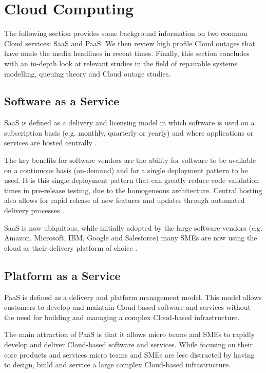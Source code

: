 \section{Cloud Computing}

The following section provides some background information on two common Cloud services: SaaS and PaaS. We then review high profile Cloud outages that have made the media headlines in recent times. Finally, this section concludes with an in-depth look at relevant studies in the field of repairable systems modelling, queuing theory and Cloud outage studies.

\subsection{Software as a Service}

SaaS is defined as a delivery and licensing model in which software is used on a subscription basis (e.g. monthly, quarterly or yearly) and where applications or services are hosted centrally \cite{Cloudbook2015}. \par

The key benefits for software vendors are the ability for software to be available on a continuous basis (on-demand) and for a single deployment pattern to be used. It is this single deployment pattern that can greatly reduce code validation times in pre-release testing, due to the homogeneous architecture. Central hosting also allows for rapid release of new features and updates through automated delivery processes \cite{datacentre2015}. \par

SaaS is now ubiquitous, while initially adopted by the large software vendors (e.g. Amazon, Microsoft, IBM, Google and Salesforce) many SMEs are now using the cloud as their delivery platform of choice \cite{CRN2015providers}. \par


\subsection{Platform as a Service}
PaaS is defined as a delivery and platform management model. This model allows customers to develop and maintain Cloud-based software and services without the need for building and managing a complex Cloud-based infrastructure.

The main attraction of PaaS is that it allows micro teams and SMEs to rapidly develop and deliver Cloud-based software and services. While focusing on their core products and services micro teams and SMEs are less distracted by having to design, build and service a large complex Cloud-based infrastructure. 

